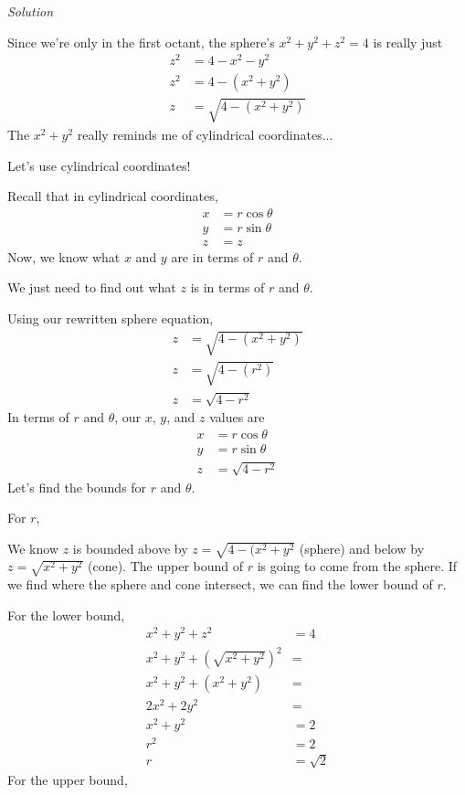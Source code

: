 \documentclass{article}
\newcommand{\lrp}[1]{\left( #1 \right)}
\newcommand{\Solution}{\textit{Solution}}
\begin{document}
\Solution

Since we're only in the first octant, the sphere's $x^2+y^2+z^2=4$ is really just
\begin{align*}
    z^2&=4-x^2-y^2\\
    z^2&=4-(x^2+y^2)\\
    z&=\sqrt{4-(x^2+y^2)}\tag{first octant only}
\end{align*}
The $x^2+y^2$ really reminds me of cylindrical coordinates...

Let's use cylindrical coordinates!

Recall that in cylindrical coordinates,
\begin{align*}
    x&=r\cos \theta\\
    y&=r\sin \theta\\
    z&=z
\end{align*}
Now, we know what $x$ and $y$ are in terms of $r$ and $\theta$.

We just need to find out what $z$ is in terms of $r$ and $\theta$.

Using our rewritten sphere equation,
\begin{align*}
  z&=\sqrt{4-(x^2+y^2)}\\
  z&=\sqrt{4-(r^2)}\tag{in polar, $x^2+y^2=r^2$}\\
  z&=\sqrt{4-r^2}
\end{align*}
In terms of $r$ and $\theta$, our $x$, $y$, and $z$ values are
\begin{align*}
    x&=r\cos\theta\\
    y&=r\sin\theta\\
    z&=\sqrt{4-r^2}
\end{align*}
Let's find the bounds for $r$ and $\theta$.

For $r$,

We know $z$ is  bounded above by $z=\sqrt{4-(x^2+y^2}$ (sphere) and below by $z=\sqrt{x^2+y^2}$ (cone). The upper bound of $r$ is going to come from the sphere. If we find where the sphere and cone intersect, we can find the lower bound of $r$.

For the lower bound,
\begin{align*}
    x^2+y^2+z^2&=4\\
    x^2+y^2+\lrp{\sqrt{x^2+y^2}}^2&=\\
    x^2+y^2+\lrp{x^2+y^2}&=\\
    2x^2+2y^2&=\\
    x^2+y^2&=2\\
    r^2&=2\tag{in polar, $x^2+y^2=r^2$}\\
    r&=\sqrt{2}\tag{$r\geq 0$ is always true}
\end{align*}
For the upper bound,
\end{document}
